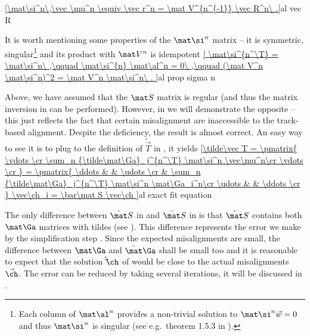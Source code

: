 \eqref{\mat\si^n\,\vec \mu^n \equiv \vec r^n = \mat V^{n^{-1}} \vec R^n\ .}{al vec R}

It is worth mentioning some properties of the $\mat\si^n$ matrix -- it is symmetric, singular\footnote{%
Each column of $\mat\al^n$ provides a non-trivial solution to $\mat\si^{n} \vec w = 0$ and thus $\mat\si^n$ is singular (see e.g.~theorem 1.5.3 in ).} and its product with $\mat V^n$ is idempotent
\eqref{
	\mat\si^{n^\T} = \mat\si^n\ ,\qquad
	\mat\si^{n} \mat\al^n = 0\ ,\qquad
	(\mat V^n \mat\si^n)^2 = \mat V^n \mat\si^n\ .
}{al prop sigma n}

Above, we have assumed that the $\mat S$ matrix is regular (and thus the matrix inversion in  can be performed). However, in  we will demonstrate the opposite -- this just reflects the fact that certain misalignment are inaccessible to the track-based alignment. Despite the deficiency, the result  is almost correct. An easy way to see it is to plug  to the definition of $\tilde\vec T$ in , it yields
\eqref{\tilde\vec T =
\pmatrix{
	\vdots \cr
	\sum_n {\tilde\mat\Ga}_j^{n^\T} \mat\si^n \vec\mu^n\cr
	\vdots \cr
}
=
\pmatrix{
	\ddots & & \udots \cr
	 & \sum_n {\tilde\mat\Ga}_j^{n^\T} \mat\si^n \mat\Ga_i^n\cr
	\udots & & \ddots \cr
}
\vec\ch_i
=
\bar\mat S \vec\ch
}{al exact fit equation}

The only difference between $\tilde\mat S$ in  and $\bar\mat S$ in  is that $\tilde\mat S$ contains both $\mat\Ga$ matrices with tildes (see ). This difference represents the error we make by the simplification step . Since the expected misalignments are small, the difference between $\mat\Ga$ and $\tilde\mat\Ga$ shall be small too and it is reasonable to expect that the solution $\hat\vec\ch$ of  would be close to the actual misalignments $\vec\ch$. The error can be reduced by taking several iterations, it will be discussed in .

